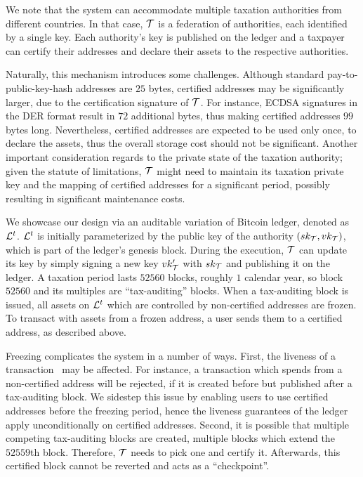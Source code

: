 We note that the system can accommodate multiple taxation authorities from
different countries. In that case, $\mathcal{T}$ is a federation of authorities,
each identified by a single key. Each authority's key is published on the
ledger and a taxpayer can certify their addresses and declare their assets to
the respective authorities.

Naturally, this mechanism introduces some challenges. Although standard
pay-to-public-key-hash addresses are $25$ bytes, certified addresses may be
significantly larger, due to the certification signature of $\mathcal{T}$. For
instance, ECDSA signatures in the DER format result in $72$ additional bytes,
thus making certified addresses $99$ bytes long. Nevertheless, certified
addresses are expected to be used only once, to declare the assets, thus the
overall storage cost should not be significant. Another important consideration
regards to the private state of the taxation authority; given the statute of
limitations, $\mathcal{T}$ might need to maintain its taxation private key and the
mapping of certified addresses for a significant period,
possibly resulting in significant maintenance costs.

We showcase our design via an auditable variation of Bitcoin ledger, denoted as
$\mathcal{L}^{t}$. $\mathcal{L}^{t}$ is initially parameterized by the public key of the
authority $(sk_{\mathcal{T}}, vk_{\mathcal{T}})$, which is
part of the ledger's genesis block. During the execution, $\mathcal{T}$ can update
its key by simply signing a new key $vk_{\mathcal{T}}'$ with
$sk_{\mathcal{T}}$ and publishing it on the ledger. A taxation period lasts
$52560$ blocks, \ie roughly $1$ calendar year, so block $52560$ and its
multiples are ``tax-auditing'' blocks.  When a tax-auditing block is issued,
all assets on $\mathcal{L}^{t}$ which are controlled by non-certified addresses are
frozen. To transact with assets from a frozen address, a user sends them to a
certified address, as described above.

Freezing complicates the system in a number of ways. First, the liveness
of a transaction~\cite{EC:GarKiaLeo15} may be affected. For
instance, a transaction which spends from a non-certified address will be
rejected, if it is created before but published after a tax-auditing block. We
sidestep this issue by enabling users to use certified addresses before the
freezing period, hence the liveness guarantees of the ledger apply
unconditionally on certified addresses. Second, it is possible that multiple
competing tax-auditing blocks are created, \eg multiple blocks which extend the
$52559$th block. Therefore, $\mathcal{T}$ needs to pick one and certify it.
Afterwards, this certified block cannot be reverted and acts as a
``checkpoint''.

